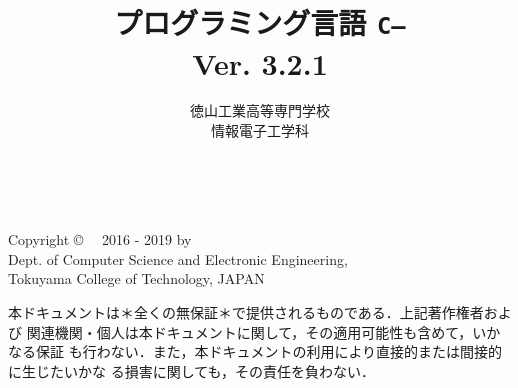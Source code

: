 \documentclass[11pt,a4j,twoside,dvipdfmx]{jbook}
\newcommand{\ver}{Ver. 3.2.1}
\newcommand{\cmm}{{\tt C--}}
\begin{document}
\setlength{\oddsidemargin}{10pt}
\setlength{\evensidemargin}{-10pt}
\setlength{\headsep}{1cm}
\frontmatter

\title{プログラミング言語 \cmm \\\ver}
\author{徳山工業高等専門学校\\情報電子工学科}
\date{}

\maketitle

\thispagestyle{empty}
~
\vfill
\begin{flushleft}
Copyright \copyright ~~ 2016 - 2019 by \\
Dept. of Computer Science and Electronic Engineering, \\
Tokuyama College of Technology, JAPAN
\end{flushleft}

\vspace{0.8cm}

本ドキュメントは＊全くの無保証＊で提供されるものである．上記著作権者および
関連機関・個人は本ドキュメントに関して，その適用可能性も含めて，いかなる保証
も行わない．また，本ドキュメントの利用により直接的または間接的に生じたいかな
る損害に関しても，その責任を負わない．
\setcounter{page}{0}

\tableofcontents

\mainmatter

\appendix

\backmatter
\pagestyle{empty}
\onecolumn
~
\end{document}
